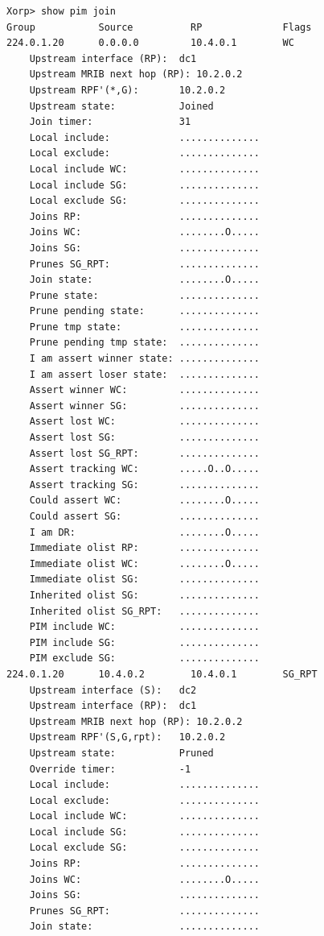 \documentclass[11pt]{report}
\begin{document}
\begin{itemize}
\begin{verbatim}
Xorp> show pim join 
Group           Source          RP              Flags
224.0.1.20      0.0.0.0         10.4.0.1        WC   
    Upstream interface (RP):  dc1
    Upstream MRIB next hop (RP): 10.2.0.2
    Upstream RPF'(*,G):       10.2.0.2
    Upstream state:           Joined 
    Join timer:               31
    Local include:            ..............
    Local exclude:            ..............
    Local include WC:         ..............
    Local include SG:         ..............
    Local exclude SG:         ..............
    Joins RP:                 ..............
    Joins WC:                 ........O.....
    Joins SG:                 ..............
    Prunes SG_RPT:            ..............
    Join state:               ........O.....
    Prune state:              ..............
    Prune pending state:      ..............
    Prune tmp state:          ..............
    Prune pending tmp state:  ..............
    I am assert winner state: ..............
    I am assert loser state:  ..............
    Assert winner WC:         ..............
    Assert winner SG:         ..............
    Assert lost WC:           ..............
    Assert lost SG:           ..............
    Assert lost SG_RPT:       ..............
    Assert tracking WC:       .....O..O.....
    Assert tracking SG:       ..............
    Could assert WC:          ........O.....
    Could assert SG:          ..............
    I am DR:                  ........O.....
    Immediate olist RP:       ..............
    Immediate olist WC:       ........O.....
    Immediate olist SG:       ..............
    Inherited olist SG:       ..............
    Inherited olist SG_RPT:   ..............
    PIM include WC:           ..............
    PIM include SG:           ..............
    PIM exclude SG:           ..............
224.0.1.20      10.4.0.2        10.4.0.1        SG_RPT 
    Upstream interface (S):   dc2
    Upstream interface (RP):  dc1
    Upstream MRIB next hop (RP): 10.2.0.2
    Upstream RPF'(S,G,rpt):   10.2.0.2
    Upstream state:           Pruned 
    Override timer:           -1
    Local include:            ..............
    Local exclude:            ..............
    Local include WC:         ..............
    Local include SG:         ..............
    Local exclude SG:         ..............
    Joins RP:                 ..............
    Joins WC:                 ........O.....
    Joins SG:                 ..............
    Prunes SG_RPT:            ..............
    Join state:               ..............

\end{verbatim}
\end{itemize}
\end{document}

